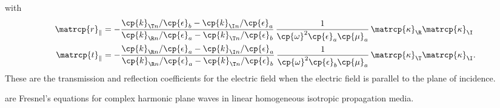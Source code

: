 \begin{refsection}
with
\begin{align}
    \matrcp{r}_\parallel
    &=
    -
    \frac{
        \cp{k}_{\T n} / \cp{\epsilon}_b   -   \cp{k}_{\I n} / \cp{\epsilon}_a
    }{
        \cp{k}_{\R n} / \cp{\epsilon}_a   -   \cp{k}_{\T n} / \cp{\epsilon}_b
    }
    \,
    \frac{1}{
        \cp{\omega}^2 \cp{\epsilon}_a \cp{\mu}_a
    }
    \,
    \matrcp{\kappa}_\R \matrcp{\kappa}_\I
    \label{eq:complex_fresnel_rp}
    \\
    \matrcp{t}_\parallel
    &=
    -
    \frac{
        \cp{k}_{\R n} / \cp{\epsilon}_a   -   \cp{k}_{\I n} / \cp{\epsilon}_a
    }{
        \cp{k}_{\R n} / \cp{\epsilon}_a   -   \cp{k}_{\T n} / \cp{\epsilon}_b
    }
    \,
    \frac{1}{
        \cp{\omega}^2 \cp{\epsilon}_b \cp{\mu}_a
    }
    \,
    \matrcp{\kappa}_\T \matrcp{\kappa}_\I
    \text{.}
    \label{eq:complex_fresnel_tp}
\end{align}
These are the transmission and reflection coefficients for the electric field
when the electric field is parallel to the plane of incidence.

are Fresnel's equations for complex harmonic plane waves in linear homogeneous isotropic propagation media.


\end{refsection}
